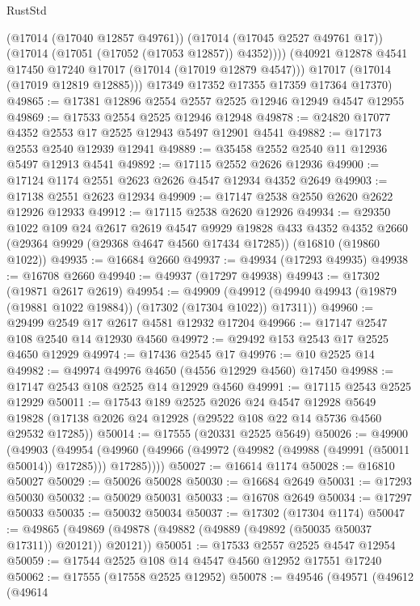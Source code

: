 \begin{lexlean}{RustStd}
\begin{coremodule}
            (@17014 (@17040 @12857 @49761))
            (@17014 (@17045 @2527 @49761 @17))
            (@17014 (@17051 (@17052 (@17053 @12857)) @4352))))
        (@40921 @12878 @4541 @17450 @17240 @17017 (@17014 (@17019 @12879 @4547)))
        @17017
        (@17014 (@17019 @12819 @12885)))
      @17349
      @17352
      @17355
      @17359
      @17364
      @17370)
@49865 := @17381 @12896 @2554 @2557 @2525 @12946 @12949 @4547 @12955
@49869 := @17533 @2554 @2525 @12946 @12948
@49878 := @24820 @17077 @4352 @2553 @17 @2525 @12943 @5497 @12901 @4541
@49882 := @17173 @2553 @2540 @12939 @12941
@49889 := @35458 @2552 @2540 @11 @12936 @5497 @12913 @4541
@49892 := @17115 @2552 @2626 @12936
@49900 := @17124 @1174 @2551 @2623 @2626 @4547 @12934 @4352 @2649
@49903 := @17138 @2551 @2623 @12934
@49909 := @17147 @2538 @2550 @2620 @2622 @12926 @12933
@49912 := @17115 @2538 @2620 @12926
@49934 := @29350
    @1022
    @109
    @24
    @2617
    @2619
    @4547
    @9929
    @19828
    @433
    @4352
    @4352
    @2660
    (@29364 @9929 (@29368 @4647 @4560 @17434 @17285))
    (@16810 (@19860 @1022))
@49935 := @16684 @2660
@49937 := @49934 (@17293 @49935)
@49938 := @16708 @2660
@49940 := @49937 (@17297 @49938)
@49943 := @17302 (@19871 @2617 @2619)
@49954 := @49909
    (@49912 (@49940 @49943 (@19879 (@19881 @1022 @19884)) (@17302 (@17304 @1022)) @17311))
@49960 := @29499 @2549 @17 @2617 @4581 @12932 @17204
@49966 := @17147 @2547 @108 @2540 @14 @12930 @4560
@49972 := @29492 @153 @2543 @17 @2525 @4650 @12929
@49974 := @17436 @2545 @17
@49976 := @10 @2525 @14
@49982 := @49974 @49976 @4650 (@4556 @12929 @4560) @17450
@49988 := @17147 @2543 @108 @2525 @14 @12929 @4560
@49991 := @17115 @2543 @2525 @12929
@50011 := @17543
    @189
    @2525
    @2026
    @24
    @4547
    @12928
    @5649
    @19828
    (@17138 @2026 @24 @12928 (@29522 @108 @22 @14 @5736 @4560 @29532 @17285))
@50014 := @17555 (@20331 @2525 @5649)
@50026 := @49900
    (@49903
      (@49954 (@49960 (@49966 (@49972 (@49982 (@49988 (@49991 (@50011 @50014)) @17285))) @17285))))
@50027 := @16614 @1174
@50028 := @16810 @50027
@50029 := @50026 @50028
@50030 := @16684 @2649
@50031 := @17293 @50030
@50032 := @50029 @50031
@50033 := @16708 @2649
@50034 := @17297 @50033
@50035 := @50032 @50034
@50037 := @17302 (@17304 @1174)
@50047 := @49865 (@49869 (@49878 (@49882 (@49889 (@49892 (@50035 @50037 @17311)) @20121)) @20121))
@50051 := @17533 @2557 @2525 @4547 @12954
@50059 := @17544 @2525 @108 @14 @4547 @4560 @12952 @17551 @17240
@50062 := @17555 (@17558 @2525 @12952)
@50078 := @49546
    (@49571
      (@49612
        (@49614

\end{coremodule}
\end{lexlean}

